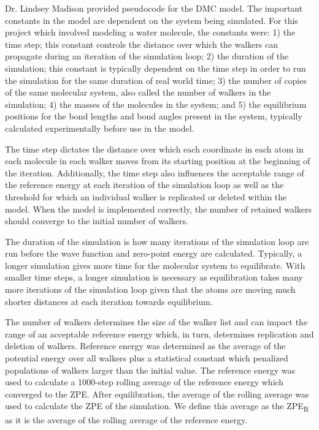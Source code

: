 \documentclass[journal=jacsat,manuscript=article]{achemso}
\begin{document}
 Dr. Lindsey Madison provided pseudocode for the DMC model. The important constants in the model are dependent on the system being simulated. For this project which involved modeling a water molecule, the constants were: 1) the time step; this constant controls the distance over which the walkers can propagate during an iteration of the simulation loop; 2) the duration of the simulation; this constant is typically dependent on the time step in order to run the simulation for the same duration of real world time; 3) the number of copies of the same molecular system, also called the number of walkers in the simulation; 4) the masses of the molecules in the system; and 5) the equilibrium positions for the bond lengths and bond angles present in the system, typically calculated experimentally before use in the model. 

The time step dictates the distance over which each coordinate in each atom in each molecule in each walker moves from its starting position at the beginning of the iteration. Additionally, the time step also influences the acceptable range of the reference energy at each iteration of the simulation loop as well as the threshold for which an individual walker is replicated or deleted within the model. When the model is implemented correctly, the number of retained walkers should converge to the initial number of walkers.

The duration of the simulation is how many iterations of the simulation loop are run before the wave function and zero-point energy are calculated. Typically, a longer simulation gives more time for the molecular system to equilibrate. With smaller time steps, a longer simulation is necessary as equilibration takes many more iterations of the simulation loop given that the atoms are moving much shorter distances at each iteration towards equilibrium. 

The number of walkers determines the size of the walker list and can impact the range of an acceptable reference energy which, in turn, determines replication and deletion of walkers. Reference energy was determined as the average of the potential energy over all walkers plus a statistical constant which penalized populations of walkers larger than the initial value. The reference energy was used to calculate a 1000-step rolling average of the reference energy which converged to the ZPE. After equilibration, the average of the rolling average was used to calculate the ZPE of the simulation. We define this average as the ZPE\textsubscript{R} as it is the average of the rolling average of the reference energy. 
\end{document}
